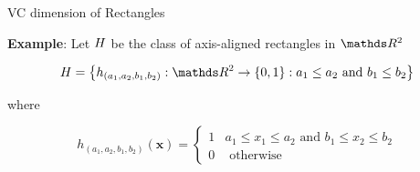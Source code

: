 % 
% 
% 
% 
% 
% 
% 




\begin{vbframe}{VC dimension of Rectangles}

\textbf{Example}: Let $H$ be the class of axis-aligned rectangles in $\R^2$

$$\Hspace=\left\{h_{\left(a_{1}, a_{2}, b_{1}, b_{2}\right)}: \R^2 \to \{0, 1\}: a_{1} \leq a_{2} \text { and } b_{1} \leq b_{2}\right\}$$

where


$$
   h_{\left(a_{1}, a_{2}, b_{1}, b_{2}\right)}\left(\bm{x}\right) = \begin{cases}
    1 & a_{1} \leq x_{1} \leq a_{2} \text { and } b_{1} \leq x_{2} \leq b_{2} \\
    0 & \text{ otherwise }
  \end{cases}
$$




\end{vbframe}
